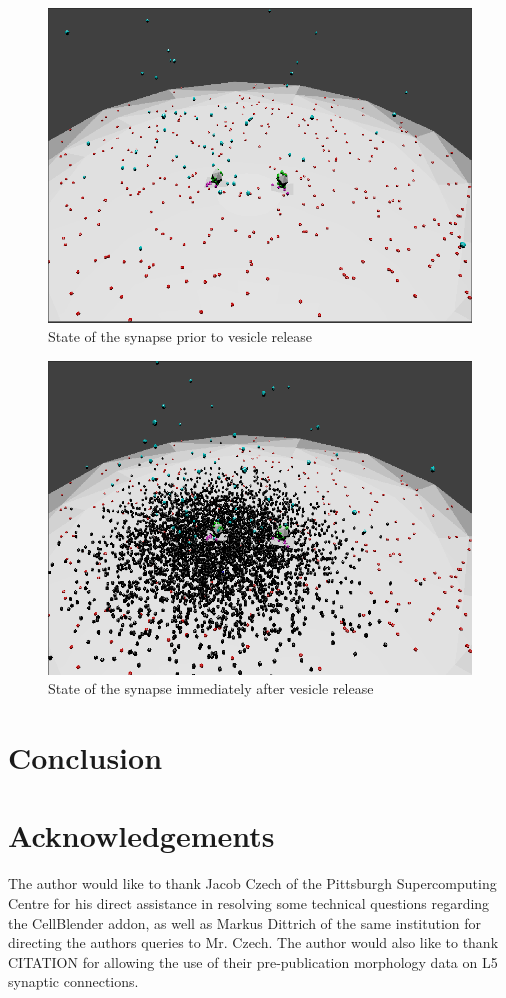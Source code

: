 \documentclass[a4paper]{article}
\begin{document}
\begin{figure}[H]
   \centering
   \includegraphics[scale = 0.4]{fig1.png} %
   \caption{State of the synapse prior to vesicle release}
   \label{fig1}
\end{figure}

\begin{figure}[H]
   \centering
   \includegraphics[scale = 0.4]{fig2.png} %
   \caption{State of the synapse immediately after vesicle release}
   \label{fig2}
\end{figure}

\section{Conclusion}

\section{Acknowledgements}
The author would like to thank Jacob Czech of the Pittsburgh Supercomputing Centre for his direct assistance in resolving some technical questions regarding the CellBlender addon, as well as Markus Dittrich of the same institution for directing the authors queries to Mr. Czech. The author would also like to thank CITATION for allowing the use of their pre-publication morphology data on L5 synaptic connections.


{}

\end{document}
